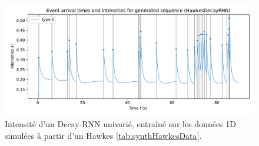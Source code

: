 \documentclass[../main.tex]{subfiles}
\begin{document}
\begin{figure}[ht]
	\includegraphics[width=\linewidth]{../results/intensity_HawkesDecayRNN_1d_hidden32_20181205-230630.pdf}
	\caption{Intensité d'un Decay-RNN univarié, entraîné sur les données 1D simulées à partir d'un Hawkes \autoref{tab:synthHawkesData}.}\label{fig:1DRNNintensityPlot}
\end{figure}
\end{document}
